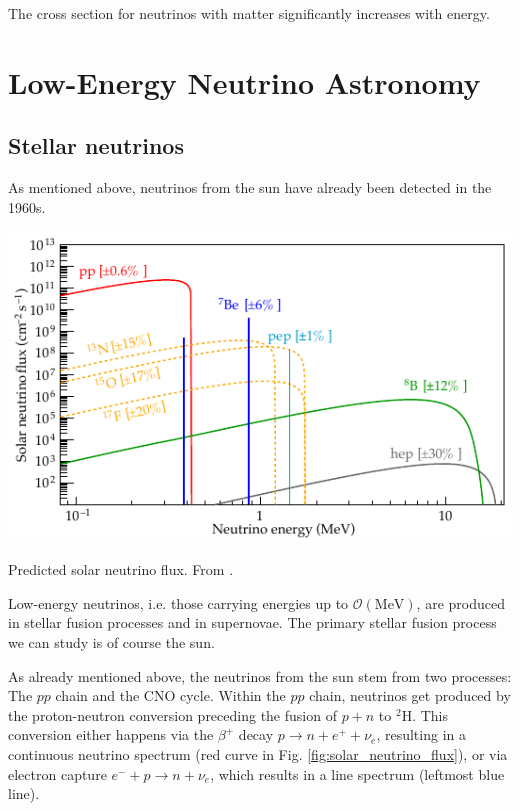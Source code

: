 \documentclass[
    a4paper, %
    fontsize=10pt, %
    twoside=false, %
    numbers=noenddot, %
    fontmethod=tex,
]{kaobook}
\begin{document}
The cross section for neutrinos with matter significantly increases with energy.


\section{Low-Energy Neutrino Astronomy}

\subsection{Stellar neutrinos}
As mentioned above, neutrinos from the sun have already been detected in the 1960s.

\begin{marginfigure}
    \includegraphics{theory/solar_neutrinos.pdf}
    \caption[Predicted solar neutrino flux]{Predicted solar neutrino flux. From \cite{Agostini2018}.}
\end{marginfigure}

Low-energy neutrinos, i.e. those carrying energies up to $\mathcal{O}(\unit{\mega\eV})$, are produced in stellar fusion processes and in supernovae. The primary stellar fusion process we can study is of course the sun.

As already mentioned above, the neutrinos from the sun stem from two processes: The $pp$ chain and the CNO cycle. Within the $pp$ chain, neutrinos get produced by the proton-neutron conversion preceding the fusion of $p+n$ to $^2 \text{H}$. This conversion either happens via the $\beta^+$ decay $p \rightarrow n + e^+ + \nu_e$, resulting in a continuous neutrino spectrum (red curve in Fig. \ref{fig:solar_neutrino_flux}), or via electron capture $e^- + p \rightarrow n + \nu_e$, which results in a line spectrum (leftmost blue line).
\end{document}
